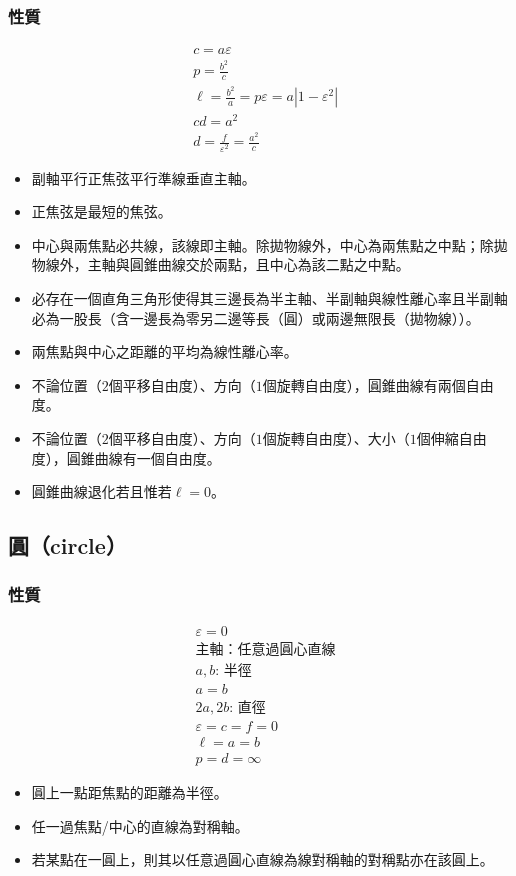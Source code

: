 \documentclass[a4paper,12pt]{report}
\begin{document}
\subsubsection{性質}
\[\begin{aligned}
&c=a\varepsilon\\
&p=\frac{b^2}{c}\\
&\ell=\frac{b^2}{a}=p\varepsilon=a|1-\varepsilon^2|\\
&cd=a^2\\
&d=\frac{f}{\varepsilon^2}=\frac{a^2}{c}
\end{aligned}\]
\begin{itemize}
\item 副軸平行正焦弦平行準線垂直主軸。
\item 正焦弦是最短的焦弦。
\item 中心與兩焦點必共線，該線即主軸。除拋物線外，中心為兩焦點之中點；除拋物線外，主軸與圓錐曲線交於兩點，且中心為該二點之中點。
\item 必存在一個直角三角形使得其三邊長為半主軸、半副軸與線性離心率且半副軸必為一股長（含一邊長為零另二邊等長（圓）或兩邊無限長（拋物線））。
\item 兩焦點與中心之距離的平均為線性離心率。
\item 不論位置（$2$個平移自由度）、方向（$1$個旋轉自由度），圓錐曲線有兩個自由度。
\item 不論位置（$2$個平移自由度）、方向（$1$個旋轉自由度）、大小（$1$個伸縮自由度），圓錐曲線有一個自由度。
\item 圓錐曲線退化若且惟若$\ell=0$。
\end{itemize}
\subsection{圓（circle）}
\subsubsection{性質}
\[\begin{aligned}
&\varepsilon=0\\
&\text{主軸：任意過圓心直線}\\
&a,b:\,\text{半徑}\\
&a=b\\
&2a,2b:\,\text{直徑}\\
&\varepsilon=c=f=0\\
&\ell=a=b\\
&p=d=\infty
\end{aligned}\]
\begin{itemize}
\item 圓上一點距焦點的距離為半徑。
\item 任一過焦點/中心的直線為對稱軸。
\item 若某點在一圓上，則其以任意過圓心直線為線對稱軸的對稱點亦在該圓上。
\end{itemize}
\end{document}
